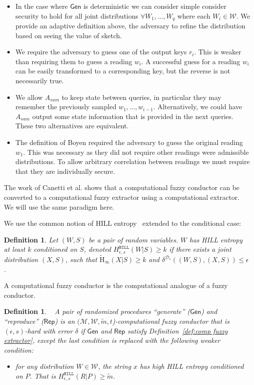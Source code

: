\documentclass[11pt]{article}
\newcommand{\defref}[1]{\mbox{Definition~\ref{#1}}}
\newcommand{\class}[1]{{\ensuremath{\mathsf{#1}}}}
\newcommand{\gen}{\ensuremath{\class{Gen}}\xspace}
\newcommand{\rep}{\ensuremath{\class{Rep}}\xspace}
\newcommand{\hill}{\ensuremath{\mathtt{HILL}}\xspace}
\newcommand{\Hav}{\tilde{\mathrm{H}}_\infty}
\newtheorem{definition}[theorem]{Definition}
\begin{document}
\begin{itemize}
\item In the case where $\gen$ is deterministic we can consider simple consider security to hold for all joint distributions $\forall W_1,..., W_q$ where each $W_i\in\mathcal{W}$.  We provide an adaptive definition above, the adversary to refine the distribution based on seeing the value of sketch.
\item We require the adversary to guess one of the output keys $r_i$.  This is weaker than requiring them to guess a reading $w_i$.  A successful guess for a reading $w_i$ can be easily transformed to a corresponding key, but the reverse is not necessarily true. 
\item We allow $A_{sam}$ to keep state between queries, in particular they may remember the previously sampled $w_1,..., w_{i-1}$.  Alternatively, we could have $A_{sam}$ output some state information that is provided in the next queries.  These two alternatives are equivalent.
\item The definition of Boyen required the adversary to guess the original reading $w_1$.  This was necessary as they did not require other readings were admissible distributions.  To allow arbitrary correlation between readings we must require that they are individually secure.
\end{itemize}

The work of Canetti et al. shows that a computational fuzzy conductor can be converted to a computational fuzzy extractor using a computational extractor.  We will use the same paradigm here.

We use the common notion of HILL entropy~\cite{DBLP:journals/siamcomp/HastadILL99} extended to the conditional case:
\begin{definition}
\label{def:hill ent}
Let $(W, S)$ be a pair of random variables.  $W$ has
\emph{HILL entropy} at least $k$ conditioned on $S$,
denoted $H^{\hill}_{\epsilon, s}(W|S)\geq k$ if there exists a joint distribution $(X, S)$, such that $\Hav(X|S)\geq k$ and $\delta^{\mathcal{D}_{s}} ((W, S),(X,S))\leq \epsilon$.
\end{definition} 
A computational fuzzy conductor is the computational analogue of a fuzzy conductor.
\begin{definition}~\cite[Definition 3.3]{canetti2014key}
\label{def:comp fuzzy cond}
A pair of randomized procedures ``generate'' ($\gen$) and ``reproduce'' ($\rep$) is an $(\mathcal{M}, \mathcal{W}, \tilde{m}, t$)-computational fuzzy conductor that is $(\epsilon, s)$-hard with error $\delta$ if $\gen$ and $\rep$ satisfy \defref{def:comp fuzzy extractor}, except the last condition is replaced with the following weaker condition:
\begin{itemize}
\item for any distribution $W\in \mathcal{W}$, the string $x$ has high HILL entropy conditioned on $P$.  That is $H^{\hill}_{\epsilon, s}(R |P)\geq \tilde{m}$.
\end{itemize}
\end{definition}
\end{document}
